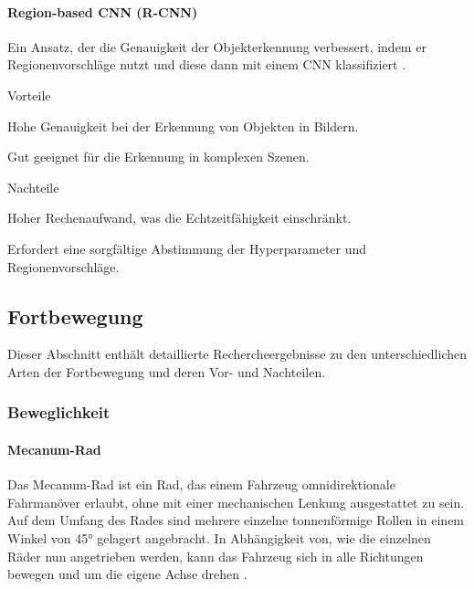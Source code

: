 \documentclass[../main.tex]{subfiles}
\begin{document}
\paragraph{Region-based CNN (R-CNN)}

Ein Ansatz, der die Genauigkeit der Objekterkennung verbessert, indem er Regionenvorschläge nutzt und diese dann mit einem CNN klassifiziert \cite{rcnn_wikipedia}.

\begin{minipage}[t]{0.48\textwidth}
    \begin{items}
      \item [Vorteile]
      \item Hohe Genauigkeit bei der Erkennung von Objekten in Bildern.
      \item Gut geeignet für die Erkennung in komplexen Szenen.
    \end{items}
\end{minipage}
\hfill
\begin{minipage}[t]{0.48\textwidth}
    \begin{items}
      \item [Nachteile]
      \item Hoher Rechenaufwand, was die Echtzeitfähigkeit einschränkt.
      \item Erfordert eine sorgfältige Abstimmung der Hyperparameter und Regionenvorschläge.
    \end{items}
\end{minipage}

\newpage
\subsection{Fortbewegung}
\label{a2:Fortbewegung}

Dieser Abschnitt enthält detaillierte Rechercheergebnisse zu den unterschiedlichen Arten der Fortbewegung und deren Vor- und Nachteilen.

\subsubsection{Beweglichkeit}

\paragraph{Mecanum-Rad} \label{recherche-mecanum-rad}

Das Mecanum-Rad ist ein Rad, das einem Fahrzeug omnidirektionale Fahrmanöver erlaubt, ohne mit einer mechanischen Lenkung ausgestattet zu sein.
Auf dem Umfang des Rades sind mehrere einzelne tonnenförmige Rollen in einem Winkel von 45° gelagert angebracht. 
In Abhängigkeit von, wie die einzelnen Räder nun angetrieben werden, kann das Fahrzeug sich in alle Richtungen bewegen und um die eigene Achse drehen \cite{mecanum_rad}.
\end{document}
